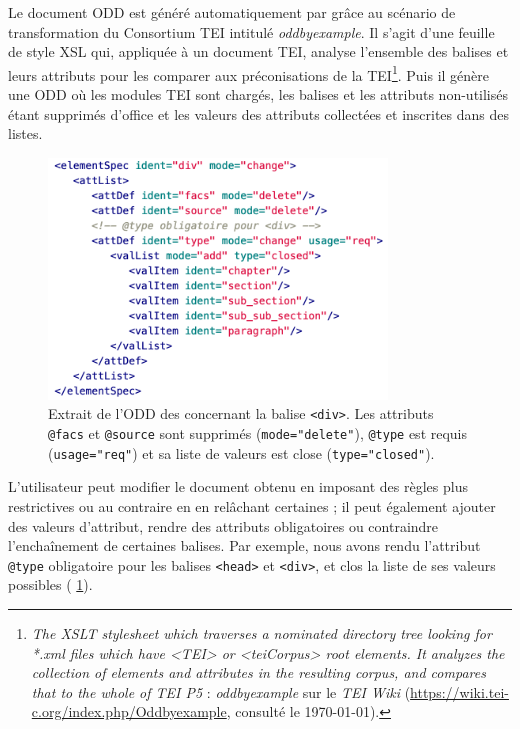 Le document ODD est généré automatiquement par \oxygen{} grâce au scénario de transformation du Consortium TEI intitulé \textit{oddbyexample}. Il s'agit d'une feuille de style XSL qui, appliquée à un document TEI, analyse l'ensemble des balises et leurs attributs pour les comparer aux préconisations de la TEI\footnote{\textit{The XSLT stylesheet which traverses a nominated directory tree looking for *.xml files which have <TEI> or <teiCorpus> root elements. It analyzes the collection of elements and attributes in the resulting corpus, and compares that to the whole of TEI P5} : \textit{oddbyexample} sur le \textit{TEI Wiki} (\url{https://wiki.tei-c.org/index.php/Oddbyexample}, consulté le \today).}. Puis il génère une ODD où les modules TEI sont chargés, les balises et les attributs non-utilisés étant supprimés d'office et les valeurs des attributs collectées et inscrites dans des listes.

\begin{figure}[ht]
    \centering
    \includegraphics[width=9cm]{img/odd.png}
    \caption[Extrait de l'ODD concernant la balise \texttt{<div>}]{Extrait de l'ODD des \odm{} concernant la balise \texttt{<div>}. Les attributs \texttt{@facs} et \texttt{@source} sont supprimés (\texttt{mode="delete"}), \texttt{@type} est requis (\texttt{usage="req"}) et sa liste de valeurs est close (\texttt{type="closed"}).}
    \label{fig:tei-odd-rng-ex}
\end{figure}

L'utilisateur peut modifier le document obtenu en imposant des règles plus restrictives ou au contraire en en relâchant certaines ; il peut également ajouter des valeurs d'attribut, rendre des attributs obligatoires ou contraindre l'enchaînement de certaines balises. Par exemple, nous avons rendu l'attribut \texttt{@type} obligatoire pour les balises \texttt{<head>} et \texttt{<div>}, et clos la liste de ses valeurs possibles (\fig{} \ref{fig:tei-odd-rng-ex}).

